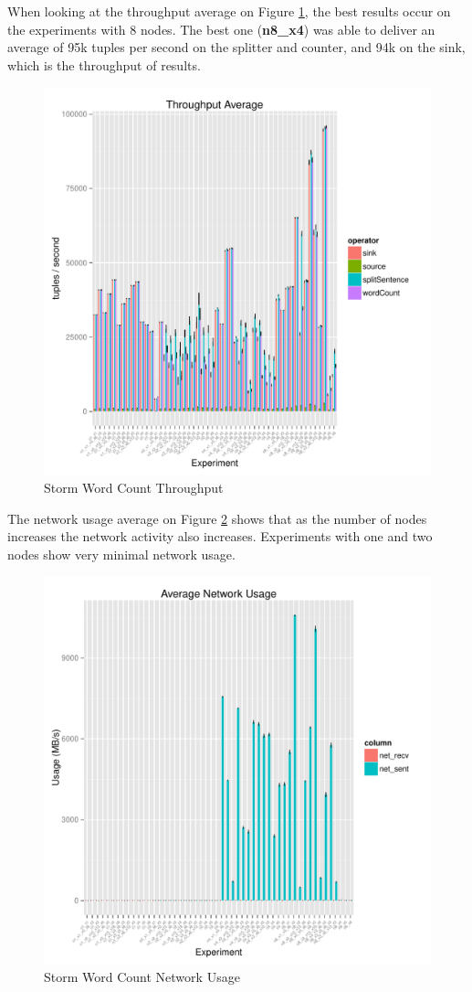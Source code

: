 \documentclass[ppgc,diss,english]{iiufrgs}
\begin{document}
When looking at the throughput average on Figure \ref{fig:storm_wordcount_throughput}, the best results occur on the experiments with 8 nodes. The best one (\textbf{n8\_x4}) was able to deliver an average of 95k tuples per second on the splitter and counter, and 94k on the sink, which is the throughput of results.

\begin{figure}[H]
    \centering
	\includegraphics[width=.6\textwidth]{summaries/storm_wordcount/full_throughput.pdf}
	\caption{Storm Word Count Throughput}
	\label{fig:storm_wordcount_throughput}
\end{figure}

The network usage average on Figure \ref{fig:storm_wordcount_network} shows that as the number of nodes increases the network activity also increases. Experiments with one and two nodes show very minimal network usage.

\begin{figure}[H]
    \centering
	\includegraphics[width=.6\textwidth]{summaries/storm_wordcount/full_network.pdf}
	\caption{Storm Word Count Network Usage}
	\label{fig:storm_wordcount_network}
\end{figure}
\end{document}
